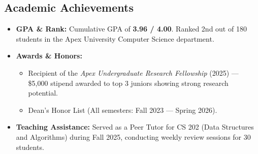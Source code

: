 \subsection{Academic Achievements}
\begin{itemize}
    \item \textbf{GPA \& Rank:} Cumulative GPA of \textbf{3.96 / 4.00}. Ranked 2nd out of 180 students in the Apex University Computer Science department.
    \item \textbf{Awards \& Honors:}
    \begin{itemize}
        \item Recipient of the \textit{Apex Undergraduate Research Fellowship} (2025) --- \$5,000 stipend awarded to top 3 juniors showing strong research potential.
        \item Dean's Honor List (All semesters: Fall 2023 --- Spring 2026).
    \end{itemize}
    \item \textbf{Teaching Assistance:} Served as a Peer Tutor for CS 202 (Data Structures and Algorithms) during Fall 2025, conducting weekly review sessions for 30 students.
\end{itemize}
